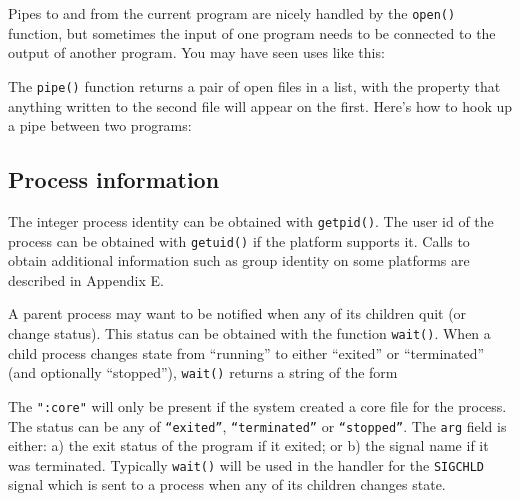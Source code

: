 
Pipes to and from the current program are nicely handled by the
\texttt{open()} function, but sometimes the input of one program needs
to be connected to the output of another program. You may have seen
uses like this:


The \texttt{pipe()} function returns a pair of open files in a list,
with the property that anything written to the second file will appear
on the first. Here's how to hook up a pipe between two
programs:


\subsection*{Process information}

The integer process identity can be obtained with
\texttt{getpid()}. The user id of the process can be
obtained with \texttt{getuid()} if the platform
supports it. Calls to obtain additional information such as group
identity on some platforms are described in Appendix E.

A parent process may want to be notified when any of its children quit
(or change status). This status can be obtained with the function
\texttt{wait()}. When a child process changes state from
``running'' to either
``exited'' or
``terminated'' (and optionally
``stopped''), \texttt{wait()} returns a
string of the form


The \texttt{":core"} will only be present if
the system created a core file for the process. The status can be any
of \texttt{``exited''},
\texttt{``terminated''} or
\texttt{``stopped''}. The \texttt{arg} field
is either: a) the exit status of the program if it exited; or b) the
signal name if it was terminated. Typically \texttt{wait()} will be
used in the handler for the \texttt{SIGCHLD} signal which is sent to a
process when any of its children changes state.

